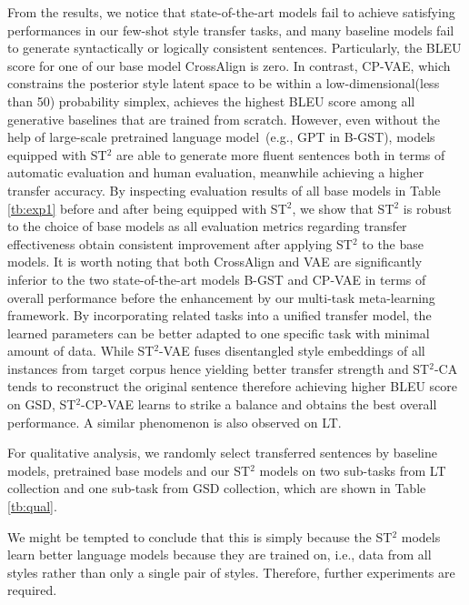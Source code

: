 From the results, we notice that state-of-the-art models fail to achieve satisfying performances in our few-shot style transfer tasks, and many baseline models fail to generate syntactically or logically consistent sentences. Particularly, the BLEU score for one of our base model CrossAlign is zero. In contrast, CP-VAE, which constrains the posterior style latent space to be within a low-dimensional(less than 50) probability simplex, achieves the highest BLEU score among all generative baselines that are trained from scratch. However, even without the help of large-scale pretrained language model~(e.g., GPT in B-GST), models equipped with ST$^2$ are able to generate more fluent sentences both in terms of automatic evaluation and human evaluation, meanwhile achieving a higher transfer accuracy.  By inspecting evaluation results of all base models in Table \ref{tb:exp1} before and after being equipped with ST$^2$, we show that ST$^2$ is robust to the choice of base models as all evaluation metrics regarding transfer effectiveness obtain consistent improvement after applying ST$^2$ to the base models. It is worth noting that both CrossAlign and VAE are significantly inferior to the two state-of-the-art models B-GST and CP-VAE in terms of overall performance before the enhancement by our multi-task meta-learning framework. By incorporating related tasks into a unified transfer model, the learned parameters can be better adapted to one specific task with minimal amount of data. While ST$^2$-VAE fuses disentangled style embeddings of all instances from target corpus hence yielding better transfer strength and ST$^2$-CA tends to reconstruct the original sentence therefore achieving higher BLEU score on GSD, ST$^2$-CP-VAE learns to strike a balance and obtains the best overall performance. A similar phenomenon is also observed on LT.

For qualitative analysis, we randomly select transferred sentences
by baseline models, pretrained base models and our ST$^2$ models
on two sub-tasks from LT collection and one sub-task from GSD collection,
which are shown in Table \ref{tb:qual}.

We might be tempted to conclude that this is simply because the
ST$^2$ models learn better language models because they are trained on,
i.e., data from all styles rather than only a single pair of styles.
Therefore, further experiments are required.
